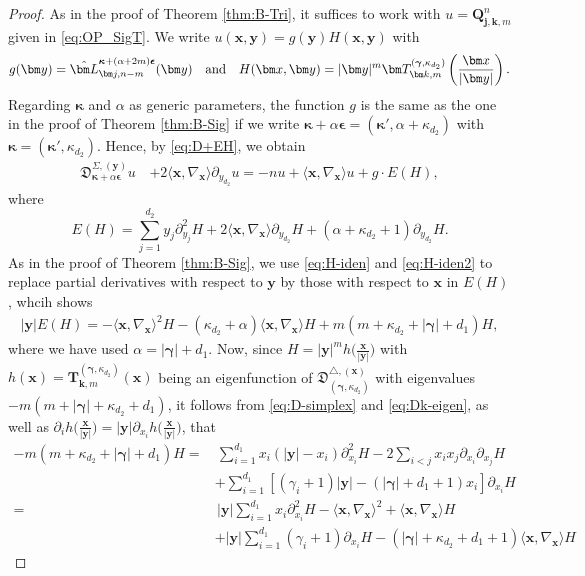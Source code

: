 \documentclass{amsart}
\theoremstyle{remark}
\def\la{{\langle}}
\def\ra{{\rangle}}
\def\fD{{\mathfrak D}}
\def\a{{\alpha}}
\def\g{{\gamma}}
\def\k{{\kappa}}
\def\la{{\langle}}
\def\ra{{\rangle}}
\def\xb{{\bm x}}
\def\yb{{\bm y}}
\def\Lb{{\bm L}}
\def\bep{{\boldsymbol{\epsilon}}}
\def\bg{{\boldsymbol{\gamma}}}
\def\bk{{\boldsymbol{\kappa}}}
\begin{document}
\begin{proof}
As in the proof of Theorem \ref{thm:B-Tri}, it suffices to work with $u =\bm Q_{\bm j, \bm k, m}^n$ given in \eqref{eq:OP_SigT}. 
We write $u(\bm x,\bm y) = g(\bm y) H(\bm x,\bm y)$ with 
$$
g(\bm y) = \hat \Lb_{\bm j, n-m}^{\bk+(\alpha+2m)\bep}(\bm y) \quad \hbox{and}\quad
  H(\bm x, \bm y) =   |\bm y|^m \bm T_{\bm k, m}^{(\bg, \k_{d_2}) } \left(\frac{\bm x}{|\bm y|}\right).
$$
Regarding $\bk$ and $\alpha$ as generic parameters, the function $g$ is the same as the one in the proof of Theorem \ref{thm:B-Sig} 
if we write $\bk+\a \bep = (\bk', \a+ \k_{d_2})$ with $\bk = (\bk', \k_{d_2})$. Hence, by \eqref{eq:D+EH}, we obtain
\begin{align*} %
  \fD_{\bk+ \alpha \bep}^{\Sigma, (\yb)} u \, & +  2\la \xb,\nabla_\xb\ra \partial_{y_{d_2}} u = 
    -n u + \la \xb,\nabla_{\xb} \ra u + g \cdot E(H), 
\end{align*}
where 
$$
  E(H) = \sum_{j=1}^{d_2} y_j \partial_{y_j}^2 H + 2 \la \xb, \nabla_\xb \ra \partial_{y_{d_2}} H  + (\a + \k_{d_2}+1) \partial_{y_{d_2}} H.
$$
As in the proof of Theorem \ref{thm:B-Sig}, we use \eqref{eq:H-iden} and \eqref{eq:H-iden2} to replace partial derivatives with 
respect to $\yb$ by those with respect to $\xb$ in $E(H)$, whcih shows
 \begin{align*}
  |\yb| E(H) =- \la \xb,\nabla_\xb\ra^2 H - (\k_{d_2} + \a) \la \xb,\nabla_\xb\ra H + m (m+\k_{d_2} +  |\bg|+ d_1) H,
\end{align*}
where we have used $\a = |\bg| + d_1$. 
Now, since $H = |\yb|^m h\big(\frac{\bm x}{|\bm y|}\big)$ with 
$h(\xb) = \bm T_{\bm k, m}^{(\bg, \k_{d_2})}(\xb)$ being an eigenfunction of $\fD_{(\bg, \k_{d_2})}^{\triangle, (\xb)}$ with 
eigenvalues $-m(m+|\bg|+\k_{d_2} + d_1)$, it follows from \eqref{eq:D-simplex} and \eqref{eq:Dk-eigen}, as well as
$\partial_i h \big(\frac{\bm x}{|\bm y|}\big) = |\yb| \partial_{x_i} h\big(\frac{\bm x}{|\bm y|}\big)$, that
\begin{align*}
 - m (m+\k_{d_2} +  |\bg|+ d_1) H  = &\, \sum_{i=1}^{d_1} x_i(|\yb|- x_i) \partial_{x_i}^2 H -
  2 \sum_{i< j} x_i x_j \partial_{x_i} \partial_{x_j} H \\
   & + \sum_{i=1}^{d_1} [(\g_i+1)|\yb| - (|\bg| +d_1+1)x_i ] \partial_{x_i} H \\
    = &\, |\yb| \sum_{i=1}^{d_1} x_i \partial_{x_i}^2 H - \la \xb, \nabla_{\xb} \ra^2 +  \la \xb, \nabla_{\xb} \ra H\\ 
     & + |\yb| \sum_{i=1}^{d_1} (\g_i+1)\partial_{x_i} H - (|\bg| + \k_{d_2} + d_1+1) \la \xb, \nabla_{\xb} \ra H 

\end{align*}
\end{proof}
\end{document}
